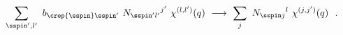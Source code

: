 \begin{equation} \label{abscoset}
\sum_{\sspin',l'}\ b_{\crep{\sspin}\sspin'}\ {N_{\sspin'l'}}^{j'}\
\chi^{(l,l')} (q)\ \longrightarrow \ \sum_{j}\ {N_{\sspin j}}^{l}\
\chi ^{(j,j')} (q)\ \ . 
\end{equation}

